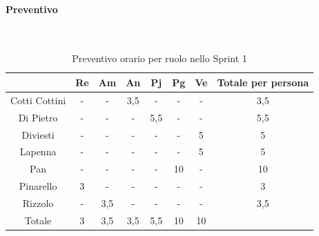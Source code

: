 \documentclass{article}
\begin{document}
                \paragraph{Preventivo}\mbox{}\\
                \begin{table}[H]
                    \centering
                    \begin{tabular}{|c|c|c|c|c|c|c|c|}
                    \hline
                                    & Re  & Am  & An  & Pj  & Pg  & Ve  & Totale per persona \\ \hline
                    Cotti Cottini & -   & -   & 3,5 & -   & -   & -   & 3,5                \\ \hline
                    Di Pietro     & -   & -   & -   & 5,5 & -   & -   & 5,5                \\ \hline
                    Diviesti      & -   & -   & -   & -   & -   & 5   & 5                  \\ \hline
                    Lapenna       & -   & -   & -   & -   & -   & 5   & 5                  \\ \hline
                    Pan           & -   & -   & -   & -   & 10  & -   & 10                 \\ \hline
                    Pinarello     & 3   & -   & -   & -   & -   & -   & 3                  \\ \hline
                    Rizzolo       & -   & 3,5 & -   & -   & -   & -   & 3,5                \\ \hline
                    Totale        & 3   & 3,5 & 3,5 & 5,5 & 10  & 10  &                    \\ \hline
                    \end{tabular}
                    \caption{Preventivo orario per ruolo nello Sprint 1}
                \end{table}

\end{document}
